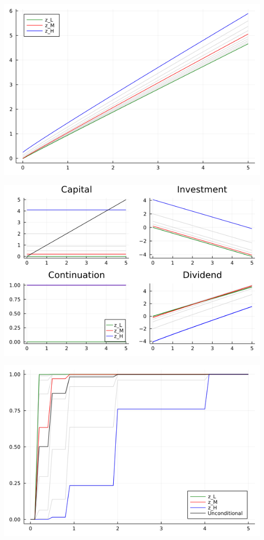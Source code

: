 \documentclass{article}
\begin{document}
\includegraphics[scale = .5]{value_function_frictionless.png}

\includegraphics[scale = .5]{policy_functions_frictionless.png}

\includegraphics[scale = .5]{cdf_frictionless.png}
\end{document}
